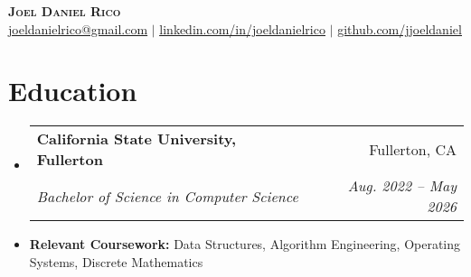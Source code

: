 \documentclass[letterpaper,11pt]{article}
\makeatletter
\newcommand{\resumeItem}[1]{
  \item\small{
    {#1 \vspace{-2pt}}
  }
}
\newcommand{\resumeSubheading}[4]{
  \vspace{-2pt}\item
    \begin{tabular*}{0.97\textwidth}[t]{l@{\extracolsep{\fill}}r}
      \textbf{#1} & #2 \\
      \textit{\small#3} & \textit{\small #4} \\
    \end{tabular*}\vspace{-7pt}
}
\newcommand{\resumeSubHeadingListStart}{\begin{itemize}[leftmargin=0.15in, label={}]}
\newcommand{\resumeSubHeadingListEnd}{\end{itemize}}
\makeatother
\begin{document}
\begin{center}
    \textbf{\Huge \scshape Joel Daniel Rico} \\ \vspace{1pt}
    \small \href{mailto:joeldanielrico@gmail.com}{\underline{joeldanielrico@gmail.com}} $|$ 
    \href{https://linkedin.com/in/joeldanielrico}{\underline{linkedin.com/in/joeldanielrico}} $|$
    \href{https://github.com/jjoeldaniel}{\underline{github.com/jjoeldaniel }}
\end{center}

\section{Education}
  \resumeSubHeadingListStart
    \resumeSubheading
      {California State University, Fullerton}{Fullerton, CA}
      {Bachelor of Science in Computer Science}{Aug. 2022 -- May 2026}
    \resumeItem{\textbf{Relevant Coursework: }Data Structures, Algorithm Engineering, Operating Systems, Discrete Mathematics}
  \resumeSubHeadingListEnd

\end{document}
